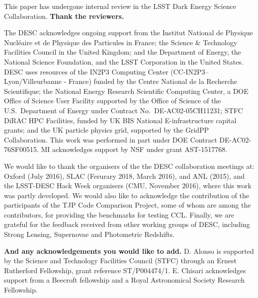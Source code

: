 %
This paper has undergone internal review in the LSST Dark Energy Science Collaboration. {\bf Thank the reviewers.}

The DESC acknowledges ongoing support from the Institut National de Physique Nucl\'eaire et de Physique des Particules in France; the Science \& Technology Facilities Council in the United Kingdom; and the Department of Energy, the National Science Foundation, and the LSST Corporation in the United States.  DESC uses resources of the IN2P3 Computing Center (CC-IN2P3--Lyon/Villeurbanne - France) funded by the Centre National de la Recherche Scientifique; the National Energy Research Scientific Computing Center, a DOE Office of Science User Facility supported by the Office of Science of the U.S.\ Department of Energy under Contract No.\ DE-AC02-05CH11231; STFC DiRAC HPC Facilities, funded by UK BIS National E-infrastructure capital grants; and the UK particle physics grid, supported by the GridPP Collaboration.  This work was performed in part under DOE Contract DE-AC02-76SF00515. MI acknowledges support by NSF under grant AST-1517768.

We would like to thank the organisers of the the DESC collaboration meetings at: Oxford (July 2016), SLAC (Ferurary 2018, March 2016), and ANL (2015), and the LSST-DESC Hack Week organisers (CMU, November 2016), where this work 
was partly developed. We would also like to acknowledge the contribution of the participants of the TJP Code Comparison Project, some of whom are among the \ccl contributors, for providing the benchmarks for  testing CCL. Finally, we are grateful for the feedback received from other working groups of DESC, including Strong Lensing, Supernovae and Photometric Redshifts.

%
{\bf And any acknowledgements you would like to add.}
D. Alonso is supported by the Science and Technology Facilities Council (STFC) through an Ernest Rutherford Fellowship, grant reference ST/P004474/1.
E. Chisari acknowledges support from a Beecroft fellowship and a Royal Astronomical Society Research Fellowship. 
